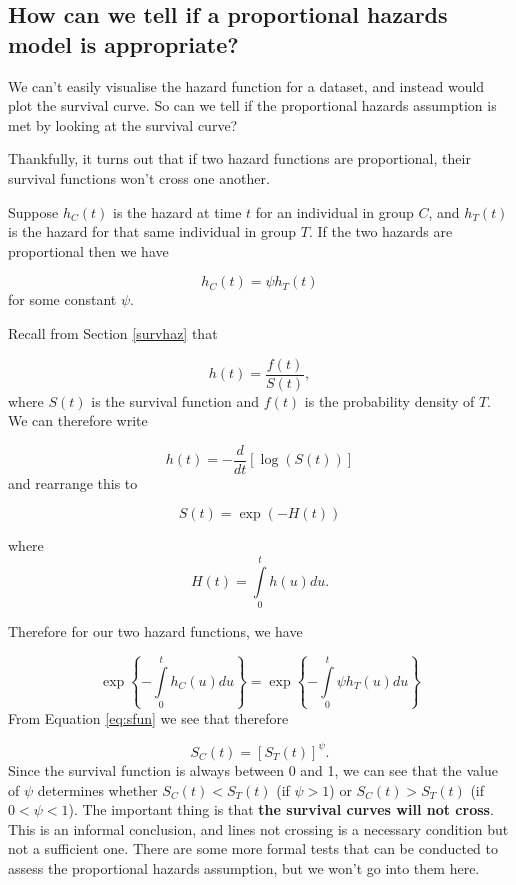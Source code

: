 \documentclass[
  openany]{book}
\theoremstyle{definition}
\theoremstyle{definition}
\theoremstyle{definition}
\theoremstyle{definition}
\theoremstyle{remark}
\begin{document}
\hypertarget{how-can-we-tell-if-a-proportional-hazards-model-is-appropriate}{%
\subsection*{How can we tell if a proportional hazards model is appropriate?}\label{how-can-we-tell-if-a-proportional-hazards-model-is-appropriate}}

We can't easily visualise the hazard function for a dataset, and instead would plot the survival curve. So can we tell if the proportional hazards assumption is met by looking at the survival curve?

Thankfully, it turns out that if two hazard functions are proportional, their survival functions won't cross one another.

Suppose \(h_C\left(t\right)\) is the hazard at time \(t\) for an individual in group \(C\), and \(h_T\left(t\right)\) is the hazard for that same individual in group \(T\). If the two hazards are proportional then we have

\[h_C\left(t\right) = \psi h_T\left(t\right) \]
for some constant \(\psi\).

Recall from Section \ref{survhaz} that

\[h\left(t\right) = \frac{f\left(t\right)}{S\left(t\right)},\]
where \(S\left(t\right)\) is the survival function and \(f\left(t\right)\) is the probability density of \(T\). We can therefore write

\[h\left(t\right) = -\frac{d}{dt}\left[\log\left(S\left(t\right)\right)\right]\]
and rearrange this to

\begin{equation}
S\left(t\right) = \exp \left(-H\left(t\right)\right)
\label{eq:sfun}
\end{equation}

where \[H\left(t\right) = \int\limits_0^t h\left(u\right) du.\]

Therefore for our two hazard functions, we have

\[\exp\left\lbrace - \int\limits_0^t h_C\left(u\right)du \right\rbrace =\exp\left\lbrace -\int\limits_0^t\psi h_T\left(u\right) du \right\rbrace  \]
From Equation \eqref{eq:sfun} we see that therefore

\[S_C\left(t\right) = \left[S_T\left(t\right)\right]^\psi.\]
Since the survival function is always between 0 and 1, we can see that the value of \(\psi\) determines whether \(S_C\left(t\right)<S_T\left(t\right)\) (if \(\psi>1\)) or \(S_C\left(t\right)>S_T\left(t\right)\) (if \(0<\psi<1\)). The important thing is that \textbf{the survival curves will not cross}. This is an informal conclusion, and lines not crossing is a necessary condition but not a sufficient one. There are some more formal tests that can be conducted to assess the proportional hazards assumption, but we won't go into them here.
\end{document}
